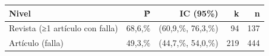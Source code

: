 \begin{tabular}{lrrrr}
\toprule
Nivel & P̂ & IC (95\%) & k & n\\
\midrule
Revista (≥1 artículo con falla) & 68,6,\% & (60,9,\%, 76,3,\%) & 94 & 137\\
Artículo (falla) & 49,3,\% & (44,7,\%, 54,0,\%) & 219 & 444\\
\bottomrule
\end{tabular}
